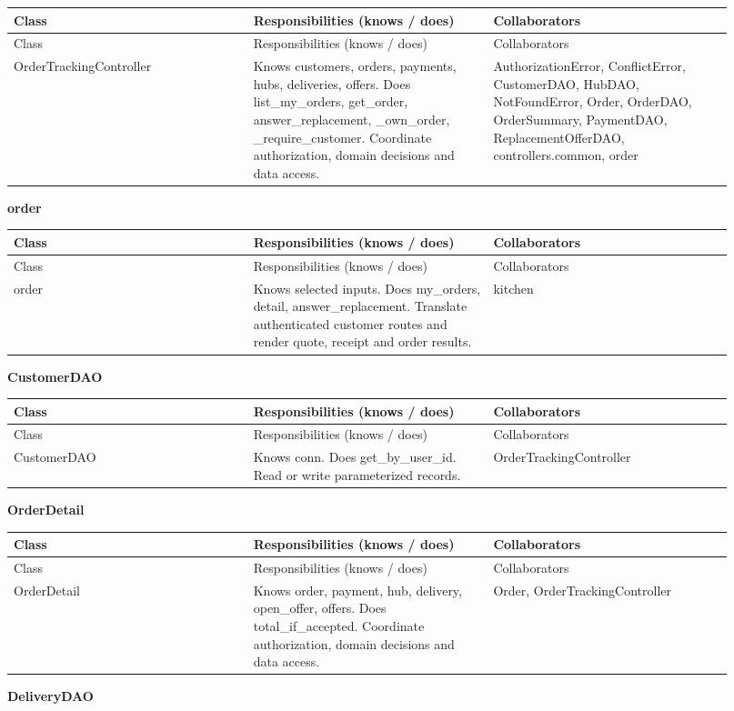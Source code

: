 \begin{longtable}{>{\raggedright\arraybackslash}p{0.3067\linewidth}>{\raggedright\arraybackslash}p{0.3067\linewidth}>{\raggedright\arraybackslash}p{0.3067\linewidth}}
Class & Responsibilities (knows / does) & Collaborators \\
\hline\endfirsthead
Class & Responsibilities (knows / does) & Collaborators \\
\hline\endhead
OrderTrackingController & Knows customers, orders, payments, hubs, deliveries, offers. Does list\_my\_orders, get\_order, answer\_replacement, \_own\_order, \_require\_customer. Coordinate authorization, domain decisions and data access. & AuthorizationError, ConflictError, CustomerDAO, HubDAO, NotFoundError, Order, OrderDAO, OrderSummary, PaymentDAO, ReplacementOfferDAO, controllers.common, order \\
\end{longtable}
\textbf{order}

\begin{longtable}{>{\raggedright\arraybackslash}p{0.3067\linewidth}>{\raggedright\arraybackslash}p{0.3067\linewidth}>{\raggedright\arraybackslash}p{0.3067\linewidth}}
Class & Responsibilities (knows / does) & Collaborators \\
\hline\endfirsthead
Class & Responsibilities (knows / does) & Collaborators \\
\hline\endhead
order & Knows selected inputs. Does my\_orders, detail, answer\_replacement. Translate authenticated customer routes and render quote, receipt and order results. & kitchen \\
\end{longtable}
\textbf{CustomerDAO}

\begin{longtable}{>{\raggedright\arraybackslash}p{0.3067\linewidth}>{\raggedright\arraybackslash}p{0.3067\linewidth}>{\raggedright\arraybackslash}p{0.3067\linewidth}}
Class & Responsibilities (knows / does) & Collaborators \\
\hline\endfirsthead
Class & Responsibilities (knows / does) & Collaborators \\
\hline\endhead
CustomerDAO & Knows conn. Does get\_by\_user\_id. Read or write parameterized records. & OrderTrackingController \\
\end{longtable}
\textbf{OrderDetail}

\begin{longtable}{>{\raggedright\arraybackslash}p{0.3067\linewidth}>{\raggedright\arraybackslash}p{0.3067\linewidth}>{\raggedright\arraybackslash}p{0.3067\linewidth}}
Class & Responsibilities (knows / does) & Collaborators \\
\hline\endfirsthead
Class & Responsibilities (knows / does) & Collaborators \\
\hline\endhead
OrderDetail & Knows order, payment, hub, delivery, open\_offer, offers. Does total\_if\_accepted. Coordinate authorization, domain decisions and data access. & Order, OrderTrackingController \\
\end{longtable}
\textbf{DeliveryDAO}

